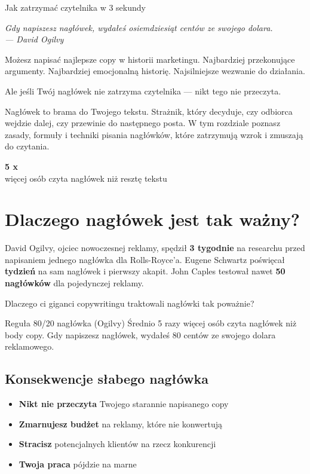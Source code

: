 \documentclass[
  12pt,
  a4paper,
  twoside,
  openright,
  12pt,
  DIV=12,
  BCOR=12mm]{scrbook}
\providecommand{\tightlist}{%
  \setlength{\itemsep}{0pt}\setlength{\parskip}{0pt}}\usepackage{longtable,booktabs,array}
\newcommand{\chapteropener}[1]{%
  \begin{center}
    \large\itshape\color{textmuted}#1
  \end{center}
  \vspace{1em}
}
\newcommand{\stathighlight}[2]{%
  \begin{center}
    \begin{tcolorbox}[
      enhanced,
      colback=primarylight,
      colframe=primaryblue,
      boxrule=1pt,
      arc=5pt,
      width=0.6\textwidth,
      halign=center
    ]
      {\fontsize{36}{40}\selectfont\bfseries\color{primarydark}#1}\\[5pt]
      {\color{textmuted}#2}
    \end{tcolorbox}
  \end{center}
}
\begin{document}
Jak zatrzymać czytelnika w 3 sekundy

\hfill\break

\chapteropener{Gdy napiszesz nagłówek, wydałeś osiemdziesiąt centów ze swojego dolara.\\--- David Ogilvy}

Możesz napisać najlepsze copy w historii marketingu. Najbardziej
przekonujące argumenty. Najbardziej emocjonalną historię. Najsilniejsze
wezwanie do działania.

Ale jeśli Twój nagłówek nie zatrzyma czytelnika --- nikt tego nie
przeczyta.

Nagłówek to brama do Twojego tekstu. Strażnik, który decyduje, czy
odbiorca wejdzie dalej, czy przewinie do następnego posta. W tym
rozdziale poznasz zasady, formuły i techniki pisania nagłówków, które
zatrzymują wzrok i zmuszają do czytania.

\stathighlight{5 x}{więcej osób czyta nagłówek niż resztę tekstu}

\section{Dlaczego nagłówek jest tak
ważny?}\label{dlaczego-nagux142uxf3wek-jest-tak-waux17cny}

David Ogilvy, ojciec nowoczesnej reklamy, spędził \textbf{3 tygodnie} na
researchu przed napisaniem jednego nagłówka dla Rolls-Royce'a. Eugene
Schwartz poświęcał \textbf{tydzień} na sam nagłówek i pierwszy akapit.
John Caples testował nawet \textbf{50 nagłówków} dla pojedynczej
reklamy.

Dlaczego ci giganci copywritingu traktowali nagłówki tak poważnie?

\begin{pojecie}{Reguła 80/20 nagłówka (Ogilvy)}
Średnio 5 razy więcej osób czyta nagłówek niż body copy. Gdy napiszesz nagłówek, wydałeś 80 centów ze swojego dolara reklamowego.
\end{pojecie}

\subsection{Konsekwencje słabego
nagłówka}\label{konsekwencje-sux142abego-nagux142uxf3wka}

\begin{itemize}
\tightlist
\item
  \textbf{Nikt nie przeczyta} Twojego starannie napisanego copy
\item
  \textbf{Zmarnujesz budżet} na reklamy, które nie konwertują
\item
  \textbf{Stracisz} potencjalnych klientów na rzecz konkurencji
\item
  \textbf{Twoja praca} pójdzie na marne
\end{itemize}
\end{document}
